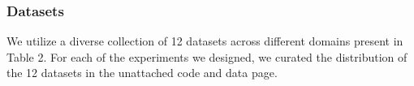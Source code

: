 \documentclass[conference]{IEEEtran}
\begin{document}
\subsubsection{Datasets}
{We utilize a diverse collection of 12 datasets across different domains} present in Table 2. For each of the experiments we designed, we curated the distribution of the 12 datasets in the unattached code and data page.



\end{document}
